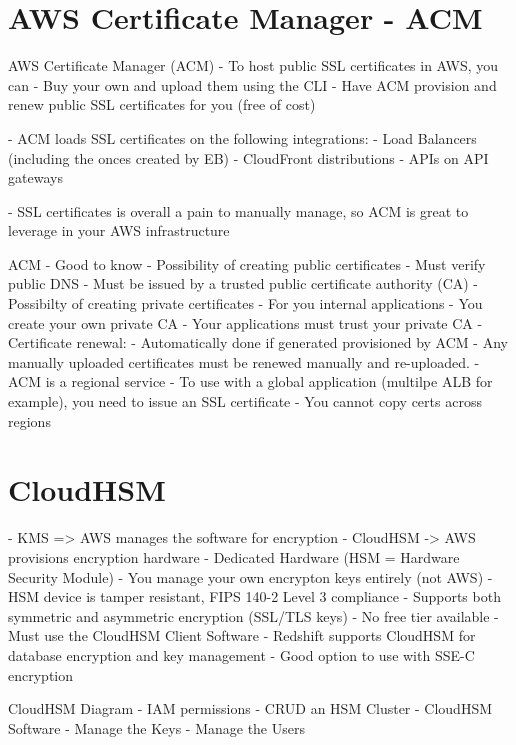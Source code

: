 \documentclass[11pt]{book}
\begin{document}
    \section{AWS Certificate Manager - ACM}

    AWS Certificate Manager (ACM)
    - To host public SSL certificates in AWS, you can
    - Buy your own and upload them using the CLI
    - Have ACM provision and renew public SSL certificates for you (free of cost)

    - ACM loads SSL certificates on the following integrations:
    - Load Balancers (including the onces created by EB)
    - CloudFront distributions
    - APIs on API gateways

    - SSL certificates is overall a pain to manually manage, so ACM is great to leverage in your AWS infrastructure


    ACM - Good to know
    - Possibility of creating public certificates
    - Must verify public DNS
    - Must be issued by a trusted public certificate authority (CA)
    - Possibilty of creating private certificates
    - For you internal applications
    - You create your own private CA
    - Your applications must trust your private CA
    - Certificate renewal:
    - Automatically done if generated provisioned by ACM
    - Any manually uploaded certificates must be renewed manually and re-uploaded.
    - ACM is a regional service
    - To use with a global application (multilpe ALB for example), you need to issue an SSL certificate
    - You cannot copy certs across regions


    \section{CloudHSM}

    - KMS => AWS manages the software for encryption
    - CloudHSM -> AWS provisions encryption hardware
    - Dedicated Hardware (HSM = Hardware Security Module)
    - You manage your own encrypton keys entirely (not AWS)
    - HSM device is tamper resistant, FIPS 140-2 Level 3 compliance
    - Supports both symmetric and asymmetric encryption (SSL/TLS keys)
    - No free tier available
    - Must use the CloudHSM Client Software
    - Redshift supports CloudHSM for database encryption and key management
    - Good option to use with SSE-C encryption

    CloudHSM Diagram
    - IAM permissions
        - CRUD an HSM Cluster
    - CloudHSM Software
        - Manage the Keys
        - Manage the Users
\end{document}
